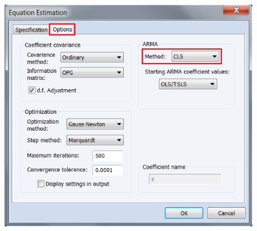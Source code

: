 \documentclass[12pt]{report}
\begin{document}
\begin{figure}[H]
	\centerline{\includegraphics{tute10_12}}
\end{figure}
\vspace{-\baselineskip} 
\end{document}
